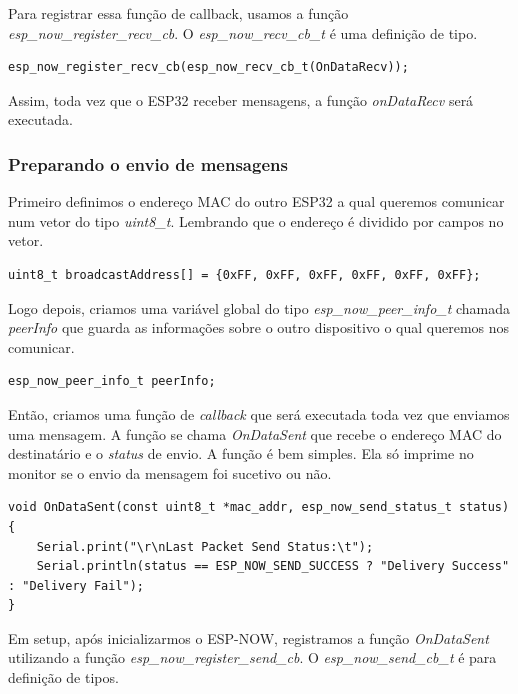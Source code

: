 \documentclass[12pt]{article}
\begin{document}
Para registrar essa função de callback, usamos a função \textit{esp\_now\_register\_recv\_cb}. O \textit{esp\_now\_recv\_cb\_t} é uma definição de tipo.

\begin{lstlisting}
esp_now_register_recv_cb(esp_now_recv_cb_t(OnDataRecv));
\end{lstlisting}

Assim, toda vez que o ESP32 receber mensagens, a função \textit{onDataRecv} será executada.

\subsubsection{Preparando o envio de mensagens}

Primeiro definimos o endereço MAC do outro ESP32 a qual queremos comunicar num vetor do tipo \textit{uint8\_t}. Lembrando que o endereço é dividido por campos no vetor. 

\begin{lstlisting}
uint8_t broadcastAddress[] = {0xFF, 0xFF, 0xFF, 0xFF, 0xFF, 0xFF};
\end{lstlisting}

Logo depois, criamos uma variável global do tipo \textit{esp\_now\_peer\_info\_t} chamada \textit{peerInfo} que guarda as informações sobre o outro dispositivo o qual queremos nos comunicar.

\begin{lstlisting}
esp_now_peer_info_t peerInfo;
\end{lstlisting}

Então, criamos uma função de \textit{callback} que será executada toda vez que enviamos uma mensagem. A função se chama \textit{OnDataSent} que recebe o endereço MAC do destinatário e o \textit{status} de envio. A função é bem simples. Ela só imprime no monitor se o envio da mensagem foi sucetivo ou não.

\begin{lstlisting}
void OnDataSent(const uint8_t *mac_addr, esp_now_send_status_t status) {
    Serial.print("\r\nLast Packet Send Status:\t");
    Serial.println(status == ESP_NOW_SEND_SUCCESS ? "Delivery Success" : "Delivery Fail");
}
\end{lstlisting}

Em setup, após inicializarmos o ESP-NOW, registramos a função \textit{OnDataSent} utilizando a função \textit{esp\_now\_register\_send\_cb}. O \textit{esp\_now\_send\_cb\_t} é para definição de tipos.
\end{document}
